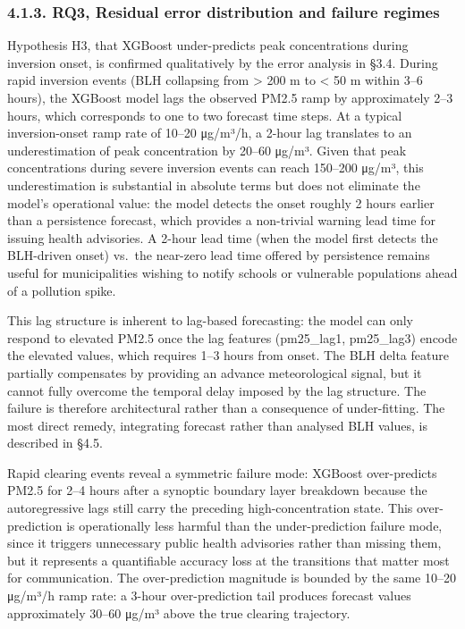 \subsubsection{4.1.3. RQ3, Residual error distribution and failure regimes}\label{rq3-residual-error-distribution-and-failure-regimes}

Hypothesis H3, that XGBoost under-predicts peak concentrations during inversion onset, is confirmed qualitatively by the error analysis in §3.4. During rapid inversion events (BLH collapsing from \textgreater{} 200 m to \textless{} 50 m within 3--6 hours), the XGBoost model lags the observed PM2.5 ramp by approximately 2--3 hours, which corresponds to one to two forecast time steps. At a typical inversion-onset ramp rate of 10--20 μg/m³/h, a 2-hour lag translates to an underestimation of peak concentration by 20--60 μg/m³. Given that peak concentrations during severe inversion events can reach 150--200 μg/m³, this underestimation is substantial in absolute terms but does not eliminate the model's operational value: the model detects the onset roughly 2 hours earlier than a persistence forecast, which provides a non-trivial warning lead time for issuing health advisories. A 2-hour lead time (when the model first detects the BLH-driven onset) vs.~the near-zero lead time offered by persistence remains useful for municipalities wishing to notify schools or vulnerable populations ahead of a pollution spike.

This lag structure is inherent to lag-based forecasting: the model can only respond to elevated PM2.5 once the lag features (pm25\_lag1, pm25\_lag3) encode the elevated values, which requires 1--3 hours from onset. The BLH delta feature partially compensates by providing an advance meteorological signal, but it cannot fully overcome the temporal delay imposed by the lag structure. The failure is therefore architectural rather than a consequence of under-fitting. The most direct remedy, integrating forecast rather than analysed BLH values, is described in §4.5.

Rapid clearing events reveal a symmetric failure mode: XGBoost over-predicts PM2.5 for 2--4 hours after a synoptic boundary layer breakdown because the autoregressive lags still carry the preceding high-concentration state. This over-prediction is operationally less harmful than the under-prediction failure mode, since it triggers unnecessary public health advisories rather than missing them, but it represents a quantifiable accuracy loss at the transitions that matter most for communication. The over-prediction magnitude is bounded by the same 10--20 μg/m³/h ramp rate: a 3-hour over-prediction tail produces forecast values approximately 30--60 μg/m³ above the true clearing trajectory.

